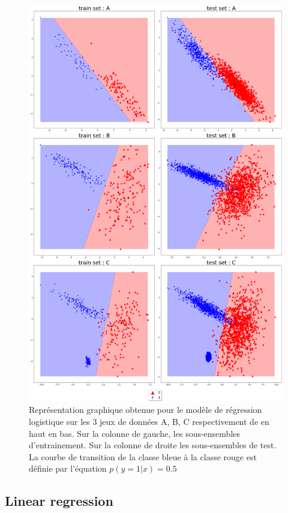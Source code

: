 \documentclass[12pt,a4paper,onecolumn]{article}
\begin{document}
\begin{figure}[H]
	\centering
	\includegraphics[height = 0.9\textheight]{logistic}
	\caption{Représentation graphique obtenue pour le modèle de régression logistique sur les 3 jeux de données A, B, C respectivement de en haut en bas. Sur la colonne de gauche, les sous-ensembles d'entrainement. Sur la colonne de droite les sous-ensembles de test. La courbe de transition de la classe bleue à la classe rouge est définie par l'équation \( p(y = 1 | x) = 0.5\)}
	\label{fig:logistic}
\end{figure}

\subsection{Linear regression}
\end{document}
